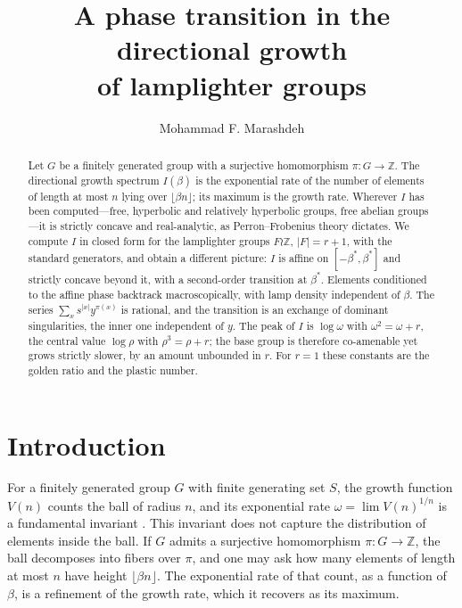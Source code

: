 \documentclass[11pt]{amsart}
\theoremstyle{definition}
\theoremstyle{remark}
\newcommand{\Z}{\mathbb{Z}}
\begin{document}
\title[Directional growth of lamplighter groups]{A phase transition in the directional growth\\ of lamplighter groups}

\author{Mohammad F. Marashdeh}
\address{Department of Mathematics, Mutah University, Karak, Jordan}

\begin{abstract}
Let $G$ be a finitely generated group with a surjective homomorphism $\pi\colon G\to\Z$. The directional growth spectrum $I(\beta)$ is the exponential rate of the number of elements of length at most $n$ lying over $\lfloor\beta n\rfloor$; its maximum is the growth rate. Wherever $I$ has been computed---free, hyperbolic and relatively hyperbolic groups, free abelian groups---it is strictly concave and real-analytic, as Perron--Frobenius theory dictates. We compute $I$ in closed form for the lamplighter groups $F\wr\Z$, $|F|=r+1$, with the standard generators, and obtain a different picture: $I$ is affine on $[-\beta^{*},\beta^{*}]$ and strictly concave beyond it, with a second-order transition at $\beta^{*}$. Elements conditioned to the affine phase backtrack macroscopically, with lamp density independent of $\beta$. The series $\sum_x s^{|x|}y^{\pi(x)}$ is rational, and the transition is an exchange of dominant singularities, the inner one independent of $y$. The peak of $I$ is $\log\omega$ with $\omega^{2}=\omega+r$, the central value $\log\rho$ with $\rho^{3}=\rho+r$; the base group is therefore co-amenable yet grows strictly slower, by an amount unbounded in $r$. For $r=1$ these constants are the golden ratio and the plastic number.
\end{abstract}


\maketitle

\section{Introduction}\label{sec:intro}

For a finitely generated group $G$ with finite generating set $S$, the growth function $V(n)$ counts the ball of radius $n$, and its exponential rate $\omega=\lim V(n)^{1/n}$ is a fundamental invariant \cite{Gromov81,Grigorchuk84,dlH00}. This invariant does not capture the distribution of elements inside the ball. If $G$ admits a surjective homomorphism $\pi\colon G\to\Z$, the ball decomposes into fibers over $\pi$, and one may ask how many elements of length at most $n$ have height $\lfloor\beta n\rfloor$. The exponential rate of that count, as a function of $\beta$, is a refinement of the growth rate, which it recovers as its maximum.
\end{document}

